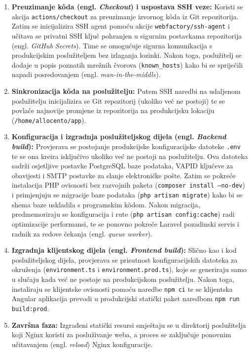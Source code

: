 \documentclass[a4paper,12pt,oneside]{article}
\begin{document}
	\begin{enumerate}
		\item \textbf{Preuzimanje kôda (engl. \textit{Checkout}) i uspostava SSH veze:} Koristi se akcija \texttt{actions/checkout} za preuzimanje izvornog kôda iz Git repozitorija. Zatim se inicijalizira SSH agent pomoću akcije \texttt{webfactory/ssh-agent} i učitava se privatni SSH ključ pohranjen u sigurnim postavkama repozitorija (engl. \textit{GitHub Secrets}). Time se omogućuje sigurna komunikacija s produkcijskim poslužiteljem bez izlaganja lozinki. Nakon toga, poslužitelj se dodaje u popis poznatih mrežnih čvorova (\texttt{known\_hosts}) kako bi se spriječili napadi posredovanjem (engl. \textit{man-in-the-middle}).
		
		\item \textbf{Sinkronizacija kôda na poslužitelju:} Putem SSH naredbi na udaljenom poslužitelju inicijalizira se Git repozitorij (ukoliko već ne postoji) te se povlače najnovije promjene iz repozitorija na produkcijsku lokaciju (\texttt{/home/allocento/app}).
		
		\item \textbf{Konfiguracija i izgradnja poslužiteljskog dijela (engl. \textit{Backend build}):} Provjerava se postojanje produkcijske konfiguracijske datoteke \texttt{.env} te se ona kreira isključivo ukoliko već ne postoji na poslužitelju. Ova datoteka sadrži osjetljive postavke PostgreSQL baze podataka, VAPID ključeve za obavijesti i SMTP postavke za slanje elektroničke pošte. Zatim se pokreće instalacija PHP ovisnosti bez razvojnih paketa (\texttt{composer install --no-dev}) i primjenjuju se migracije baze podataka (\texttt{php artisan migrate}) kako bi se shema baze uskladila s programskim kôdom. Nakon migracija, predmemoriraju se konfiguracija i rute (\texttt{php artisan config:cache}) radi optimizacije performansi, te se ponovno pokreće Laravel pozadinski servis i radnik za redove čekanja (engl. \textit{queue worker}).
		
		\item \textbf{Izgradnja klijentskog dijela (engl. \textit{Frontend build}):} Slično kao i kod poslužiteljskog dijela, provjerava se prisutnost konfiguracijskih datoteka za okruženja (\texttt{environment.ts} i \texttt{environment.prod.ts}), koje se generiraju samo u slučaju kada već ne postoje na produkcijskom poslužitelju. Nakon toga, instaliraju se klijentske ovisnosti pomoću naredbe \texttt{npm ci} te se klijentska Angular aplikacija prevodi u produkcijski statički paket naredbom \texttt{npm run build:prod}.
		
		\item \textbf{Završna faza:} Izgrađeni statički resursi smještaju se u direktorij poslužitelja koji Nginx koristi za posluživanje weba, a proces se zaključuje ponovnim učitavanjem (engl. \textit{reload}) Nginx konfiguracije.
	\end{enumerate}
\end{document}
